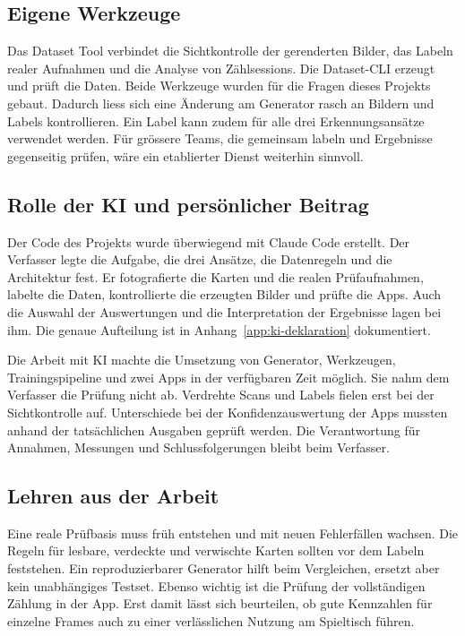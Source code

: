 \subsection{Eigene Werkzeuge}\label{sec:eigene-werkzeuge}

Das Dataset Tool verbindet die Sichtkontrolle der gerenderten Bilder,
das Labeln realer Aufnahmen und die Analyse von Zählsessions. Die
Dataset-CLI erzeugt und prüft die Daten. Beide Werkzeuge wurden für
die Fragen dieses Projekts gebaut. Dadurch liess sich eine Änderung
am Generator rasch an Bildern und Labels kontrollieren. Ein Label
kann zudem für alle drei Erkennungsansätze verwendet werden. Für
grössere Teams, die gemeinsam labeln und Ergebnisse gegenseitig
prüfen, wäre ein etablierter Dienst weiterhin sinnvoll.

\subsection{Rolle der KI und persönlicher Beitrag}\label{sec:ki-reflexion}

Der Code des Projekts wurde überwiegend mit Claude Code erstellt. Der
Verfasser legte die Aufgabe, die drei Ansätze, die Datenregeln und die
Architektur fest. Er fotografierte die Karten und die realen
Prüfaufnahmen, labelte die Daten, kontrollierte die erzeugten Bilder
und prüfte die Apps. Auch die Auswahl der Auswertungen und die
Interpretation der Ergebnisse lagen bei ihm. Die genaue Aufteilung
ist in Anhang~\ref{app:ki-deklaration} dokumentiert.

Die Arbeit mit KI machte die Umsetzung von Generator, Werkzeugen,
Trainingspipeline und zwei Apps in der verfügbaren Zeit möglich. Sie
nahm dem Verfasser die Prüfung nicht ab. Verdrehte Scans und Labels
fielen erst bei der Sichtkontrolle auf. Unterschiede bei der
Konfidenzauswertung der Apps mussten anhand der tatsächlichen
Ausgaben geprüft werden. Die Verantwortung für Annahmen, Messungen
und Schlussfolgerungen bleibt beim Verfasser.

\subsection{Lehren aus der Arbeit}\label{sec:lessons}

Eine reale Prüfbasis muss früh entstehen und mit neuen Fehlerfällen
wachsen. Die Regeln für lesbare, verdeckte und verwischte Karten
sollten vor dem Labeln feststehen. Ein reproduzierbarer Generator
hilft beim Vergleichen, ersetzt aber kein unabhängiges Testset.
Ebenso wichtig ist die Prüfung der vollständigen Zählung in der App.
Erst damit lässt sich beurteilen, ob gute Kennzahlen für einzelne
Frames auch zu einer verlässlichen Nutzung am Spieltisch führen.

